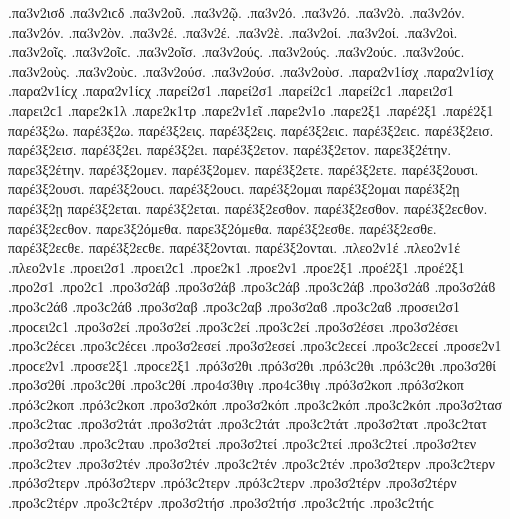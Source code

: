 {.πα3ν2ισδ .πα3ν2ιϲδ   %
.πα3ν2οῦ.   %
.πα3ν2ῷ.
.πα3ν2ό. .πα3ν2ό.
.πα3ν2ὸ.
.πα3ν2όν. .πα3ν2όν.
.πα3ν2ὸν.
.πα3ν2έ. .πα3ν2έ.
.πα3ν2ὲ.
.πα3ν2οί. .πα3ν2οί.
.πα3ν2οὶ.
.πα3ν2οῖς. .πα3ν2οῖϲ.
.πα3ν2οῖσ.
.πα3ν2ούς. .πα3ν2ούς. .πα3ν2ούϲ. .πα3ν2ούϲ.
.πα3ν2οὺς. .πα3ν2οὺϲ.
.πα3ν2ούσ. .πα3ν2ούσ.
.πα3ν2οὺσ.
.παρα2ν1ίσχ .παρα2ν1ίσχ .παρα2ν1ίϲχ .παρα2ν1ίϲχ   %
.παρεί2σ1 .παρεί2σ1 .παρεί2ϲ1 .παρεί2ϲ1   %
.παρει2σ1 .παρει2ϲ1
.παρε2κ1λ   %
.παρε2κ1τρ   %
.παρε2ν1εῖ   %
.παρε2ν1ο   %
.παρε2ξ1
.παρέ2ξ1 .παρέ2ξ1
παρέ3ξ2ω. παρέ3ξ2ω.   %
παρέ3ξ2εις. παρέ3ξ2εις. παρέ3ξ2ειϲ. παρέ3ξ2ειϲ.
παρέ3ξ2εισ. παρέ3ξ2εισ.
παρέ3ξ2ει. παρέ3ξ2ει.
παρέ3ξ2ετον. παρέ3ξ2ετον.
παρε3ξ2έτην. παρε3ξ2έτην.
παρέ3ξ2ομεν. παρέ3ξ2ομεν.
παρέ3ξ2ετε. παρέ3ξ2ετε.
παρέ3ξ2ουσι. παρέ3ξ2ουσι. παρέ3ξ2ουϲι. παρέ3ξ2ουϲι.
παρέ3ξ2ομαι παρέ3ξ2ομαι
παρέ3ξ2ῃ παρέ3ξ2ῃ
παρέ3ξ2εται. παρέ3ξ2εται.
παρέ3ξ2εσθον. παρέ3ξ2εσθον. παρέ3ξ2εϲθον. παρέ3ξ2εϲθον.
παρε3ξ2όμεθα. παρε3ξ2όμεθα.
παρέ3ξ2εσθε. παρέ3ξ2εσθε. παρέ3ξ2εϲθε. παρέ3ξ2εϲθε.
παρέ3ξ2ονται. παρέ3ξ2ονται.
.πλεο2ν1έ .πλεο2ν1έ   %
.πλεο2ν1ε
.προει2σ1 .προει2ϲ1   %
.προε2κ1   %
.προε2ν1   %
.προε2ξ1   %
.προέ2ξ1 .προέ2ξ1   %
.προ2σ1 .προ2ϲ1
.προ3σ2άβ .προ3σ2άβ .προ3ϲ2άβ .προ3ϲ2άβ .προ3σ2άϐ .προ3σ2άϐ .προ3ϲ2άϐ .προ3ϲ2άϐ %
.προ3σ2αβ .προ3ϲ2αβ .προ3σ2αϐ .προ3ϲ2αϐ
.προσει2σ1 .προϲει2ϲ1   %
.προ3σ2εί .προ3σ2εί .προ3ϲ2εί .προ3ϲ2εί   %
.προ3σ2έσει .προ3σ2έσει .προ3ϲ2έϲει .προ3ϲ2έϲει
.προ3σ2εσεί .προ3σ2εσεί .προ3ϲ2εϲεί .προ3ϲ2εϲεί
.προσε2ν1 .προϲε2ν1   %
.προσε2ξ1 .προϲε2ξ1   %
.πρό3σ2θι .πρό3σ2θι .πρό3ϲ2θι .πρό3ϲ2θι   %
.προ3σ2θί .προ3σ2θί .προ3ϲ2θί .προ3ϲ2θί
.προ4σ3θιγ .προ4ϲ3θιγ   %
.πρό3σ2κοπ .πρό3σ2κοπ .πρό3ϲ2κοπ .πρό3ϲ2κοπ   %
.προ3σ2κόπ .προ3σ2κόπ .προ3ϲ2κόπ .προ3ϲ2κόπ
.προ3σ2τασ .προ3ϲ2ταϲ   %
.προ3σ2τάτ .προ3σ2τάτ .προ3ϲ2τάτ .προ3ϲ2τάτ   %
.προ3σ2τατ .προ3ϲ2τατ   %
.προ3σ2ταυ .προ3ϲ2ταυ   %
.προ3σ2τεί .προ3σ2τεί .προ3ϲ2τεί .προ3ϲ2τεί   %
.προ3σ2τεν .προ3ϲ2τεν   %
.προ3σ2τέν .προ3σ2τέν .προ3ϲ2τέν .προ3ϲ2τέν   %
.προ3σ2τερν .προ3ϲ2τερν   %
.πρό3σ2τερν .πρό3σ2τερν .πρό3ϲ2τερν .πρό3ϲ2τερν   %
.προ3σ2τέρν .προ3σ2τέρν .προ3ϲ2τέρν .προ3ϲ2τέρν
.προ3σ2τήσ .προ3σ2τήσ .προ3ϲ2τήϲ .προ3ϲ2τήϲ   %
}
